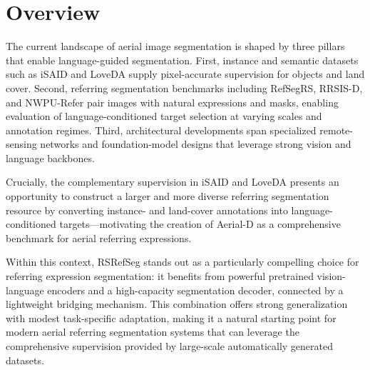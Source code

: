 \section{Overview}

The current landscape of aerial image segmentation is shaped by three pillars that enable language-guided segmentation. First, instance and semantic datasets such as iSAID and LoveDA supply pixel-accurate supervision for objects and land cover. Second, referring segmentation benchmarks including RefSegRS, RRSIS-D, and NWPU-Refer pair images with natural expressions and masks, enabling evaluation of language-conditioned target selection at varying scales and annotation regimes. Third, architectural developments span specialized remote-sensing networks and foundation-model designs that leverage strong vision and language backbones.

Crucially, the complementary supervision in iSAID and LoveDA presents an opportunity to construct a larger and more diverse referring segmentation resource by converting instance- and land-cover annotations into language-conditioned targets—motivating the creation of Aerial-D as a comprehensive benchmark for aerial referring expressions.

Within this context, RSRefSeg stands out as a particularly compelling choice for referring expression segmentation: it benefits from powerful pretrained vision-language encoders and a high-capacity segmentation decoder, connected by a lightweight bridging mechanism. This combination offers strong generalization with modest task-specific adaptation, making it a natural starting point for modern aerial referring segmentation systems that can leverage the comprehensive supervision provided by large-scale automatically generated datasets.
